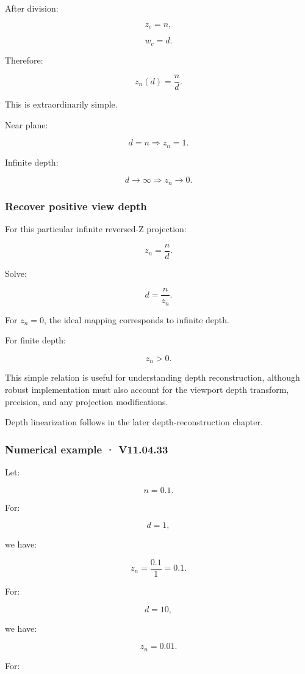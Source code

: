 After division:

\[
 z_c=n,
\]

\[
 w_c=d.
\]

Therefore:

\[
 \boxed{ z_n(d)=\frac nd }.
\]

This is extraordinarily simple.

Near plane:

\[
 d=n\Rightarrow z_n=1.
\]

Infinite depth:

\[
 d\to\infty\Rightarrow z_n\to0.
\]

\subsubsection{Recover positive view depth}\label{recover-positive-view-depth}

For this particular infinite reversed-Z projection:

\[
 z_n=\frac nd.
\]

Solve:

\[
 \boxed{ d=\frac n{z_n} }.
\]

For \(z_n=0\), the ideal mapping corresponds to infinite depth.

For finite depth:

\[
 z_n>0.
\]

This simple relation is useful for understanding depth reconstruction, although robust implementation must also account for the viewport depth transform, precision, and any projection modifications.

Depth linearization follows in the later depth-reconstruction chapter.

\subsubsection{Numerical example · V11.04.33}\label{numerical-example-v11.04.33}

Let:

\[
 n=0.1.
\]

For:

\[
 d=1,
\]

we have:

\[
 z_n=\frac{0.1}{1}=0.1.
\]

For:

\[
 d=10,
\]

we have:

\[
 z_n=0.01.
\]

For:

